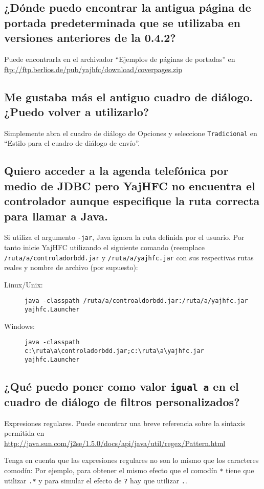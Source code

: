 \documentclass[a4paper,10pt]{scrartcl}
\begin{document}
\subsection{¿Dónde puedo encontrar la antigua página de portada predeterminada que se utilizaba en versiones anteriores de la 0.4.2?}

Puede encontrarla en el archivador ``Ejemplos de páginas de portadas'' en \url{ftp://ftp.berlios.de/pub/yajhfc/download/coverpages.zip}


\subsection{Me gustaba más el antiguo cuadro de diálogo. ¿Puedo volver a utilizarlo?}

Simplemente abra el cuadro de diálogo de Opciones y seleccione \texttt{Tradicional} en ``Estilo para el cuadro de diálogo de envío''.

\subsection{Quiero acceder a la agenda telefónica por medio de JDBC pero YajHFC no encuentra el controlador aunque especifique la ruta correcta para llamar a Java.}

Si utiliza el argumento \texttt{-jar}, Java ignora la ruta definida por el usuario.
Por tanto inicie YajHFC utilizando el siguiente comando (reemplace \texttt{/ruta/a/controladorbdd.jar} y \texttt{/ruta/a/yajhfc.jar} con sus respectivas rutas reales y nombre de archivo (por supuesto):
\begin{description}
\item [Linux/Unix:] \verb#java -classpath /ruta/a/controaldorbdd.jar:/ruta/a/yajhfc.jar yajhfc.Launcher#
\item [Windows:] \verb#java -classpath c:\ruta\a\controladorbdd.jar;c:\ruta\a\yajhfc.jar yajhfc.Launcher#
\end{description}

\subsection{¿Qué puedo poner como valor \texttt{igual a} en el cuadro de diálogo de filtros personalizados? }

Expresiones regulares. Puede encontrar una breve referencia sobre la sintaxis permitida en
\url{http://java.sun.com/j2se/1.5.0/docs/api/java/util/regex/Pattern.html}

Tenga en cuenta que las expresiones regulares no son lo mismo que los caracteres comodín:
Por ejemplo, para obtener el mismo efecto que el comodín \verb.*. tiene que utilizar \verb#.*#
y para simular el efecto de \verb#?# hay que utilizar \verb#.#.
\end{document}
